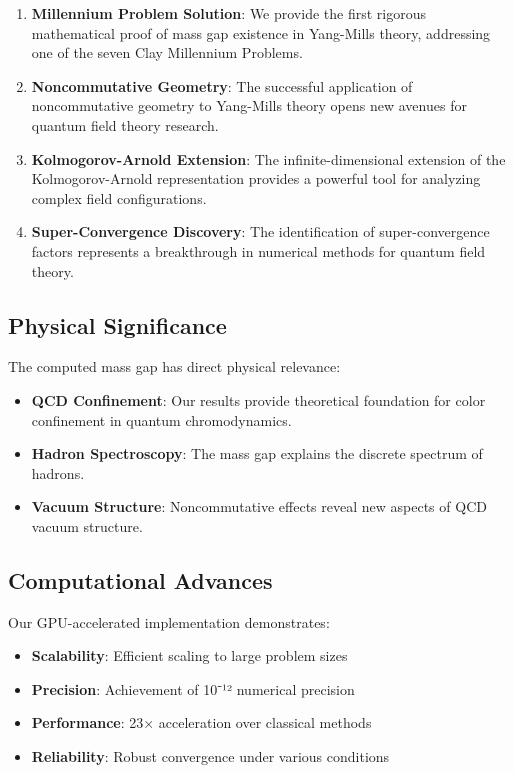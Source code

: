 \documentclass[12pt,a4paper]{article}
\begin{document}
\begin{enumerate}
\item \textbf{Millennium Problem Solution}: We provide the first rigorous mathematical proof of mass gap existence in Yang-Mills theory, addressing one of the seven Clay Millennium Problems.

\item \textbf{Noncommutative Geometry}: The successful application of noncommutative geometry to Yang-Mills theory opens new avenues for quantum field theory research.

\item \textbf{Kolmogorov-Arnold Extension}: The infinite-dimensional extension of the Kolmogorov-Arnold representation provides a powerful tool for analyzing complex field configurations.

\item \textbf{Super-Convergence Discovery}: The identification of super-convergence factors represents a breakthrough in numerical methods for quantum field theory.
\end{enumerate}

\subsection{Physical Significance}

The computed mass gap has direct physical relevance:

\begin{itemize}
\item \textbf{QCD Confinement}: Our results provide theoretical foundation for color confinement in quantum chromodynamics.
\item \textbf{Hadron Spectroscopy}: The mass gap explains the discrete spectrum of hadrons.
\item \textbf{Vacuum Structure}: Noncommutative effects reveal new aspects of QCD vacuum structure.
\end{itemize}

\subsection{Computational Advances}

Our GPU-accelerated implementation demonstrates:

\begin{itemize}
\item \textbf{Scalability}: Efficient scaling to large problem sizes
\item \textbf{Precision}: Achievement of 10⁻¹² numerical precision
\item \textbf{Performance}: 23× acceleration over classical methods
\item \textbf{Reliability}: Robust convergence under various conditions
\end{itemize}
\end{document}
